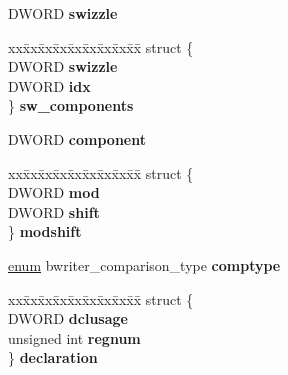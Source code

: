 \begin{DoxyCompactItemize}
\begin{tabbing}
\end{tabbing}\item 
\mbox{\label{union_y_y_s_t_y_p_e_a6f1fe24002dc5d9b0c057230dd289547}} 
D\+W\+O\+RD {\bfseries swizzle}
\item 
\mbox{\label{union_y_y_s_t_y_p_e_a4c651d7c9b9c610d597926ddc8fbf8ba}} 
\begin{tabbing}
xx\=xx\=xx\=xx\=xx\=xx\=xx\=xx\=xx\=\kill
struct \{\\
\>DWORD {\bfseries swizzle}\\
\>DWORD {\bfseries idx}\\
\} {\bfseries sw\_components}\\

\end{tabbing}\item 
\mbox{\label{union_y_y_s_t_y_p_e_aa259e59fe013f89f55ca81f2bfc594b9}} 
D\+W\+O\+RD {\bfseries component}
\item 
\mbox{\label{union_y_y_s_t_y_p_e_ae527db80bc2ef9b749f75fdedeaa4fb8}} 
\begin{tabbing}
xx\=xx\=xx\=xx\=xx\=xx\=xx\=xx\=xx\=\kill
struct \{\\
\>DWORD {\bfseries mod}\\
\>DWORD {\bfseries shift}\\
\} {\bfseries modshift}\\

\end{tabbing}\item 
\mbox{\label{union_y_y_s_t_y_p_e_a96179bb815fc92046e9ce29648133081}} 
\hyperlink{interfaceenum}{enum} bwriter\+\_\+comparison\+\_\+type {\bfseries comptype}
\item 
\mbox{\label{union_y_y_s_t_y_p_e_a8979c6f814bedef37f5d9d980c3938f3}} 
\begin{tabbing}
xx\=xx\=xx\=xx\=xx\=xx\=xx\=xx\=xx\=\kill
struct \{\\
\>DWORD {\bfseries dclusage}\\
\>unsigned int {\bfseries regnum}\\
\} {\bfseries declaration}\\


\end{tabbing}
\end{DoxyCompactItemize}
